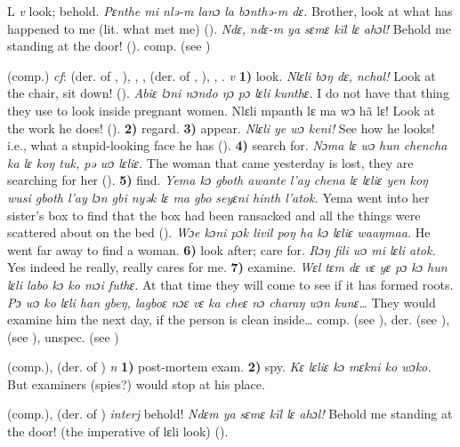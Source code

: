 \begin{letter}{L}
 \textit{v} look; behold. \textit{Pɛnthe mi nlə-m lanɔ la bɔnthə-m dɛ.} Brother, look at what has happened to me (lit. what met me) (\citealt{Pichl1967}). \textit{Ndɛ, ndɛ-m ya sɛmɛ kïl lɛ ahɔl!} Behold me standing at the door! (\citealt{Pichl1967}). comp.  (see )

 (comp.) \textit{cf}:  (der. of , ), , ,  (der. of , ), , . \textit{v} \textbf{1)} look. \textit{Nlɛli bɔŋ dɛ, nchal!} Look at the chair, sit down! (\citealt{Pichl1967}). \textit{Abiɛ lɔni nɔndo ŋɔ pɔ lɛli kunthɛ.} I do not have that thing they use to look inside pregnant women. Nlɛli mpanth lɛ ma wɔ hã lɛ! Look at the work he does! (\citealt{Pichl1967}). \textbf{2)} regard. \textbf{3)} appear. \textit{Nlɛli ye wɔ keni!} See how he looks! i.e., what a stupid-looking face he has (\citealt{Pichl1967}). \textbf{4)} search for. \textit{Nɔma lɛ wɔ hun chencha ka lɛ koŋ tuk, pə wɔ lɛliɛ.} The woman that came yesterday is lost, they are searching for her (\citealt{Pichl1967}). \textbf{5)} find. \textit{Yema kɔ gboth awante l'ay chena lɛ lɛliɛ yen koŋ wusi gboth l'ay lɔn gbi nyək lɛ ma gbo seyɛni hinth l'atok.} Yema went into her sister's box to find that the box had been ransacked and all the things were scattered about on the bed (\citealt{Pichl1967}). \textit{Wɔe kɔni pɔk livil poŋ ha kɔ lɛliɛ waaŋmaa.} He went far away to find a woman. \textbf{6)} look after; care for. \textit{Rɔŋ fili wɔ mi lɛli atok.} Yes indeed he really, really cares for me. \textbf{7)} examine. \textit{Wɛl tɛm dɛ vɛ yɛ pɔ kɔ hun lɛli labo kɔ ko mɔi futhɛ.} At that time they will come to see if it has formed roots. \textit{Pɔ wɔ ko lɛli han gbeŋ, lagboɛ nɔɛ vɛ ka cheɛ nɔ charaŋ wɔn kunɛ…} They would examine him the next day, if the person is clean inside… comp.  (see ), der.  (see ),  (see ), unspec.  (see )

 (comp.), (der. of ) \textit{n} \textbf{1)} post-mortem exam. \textbf{2)} spy. \textit{Kɛ lɛliɛ kɔ mɛkni ko wɔko.} But examiners (spies?) would stop at his place.

 (comp.), (der. of ) \textit{interj} behold! \textit{Ndɛm ya sɛmɛ kïl lɛ ahɔl!} Behold me standing at the door! (the imperative of lɛli look) (\citealt{Pichl1967}). 


\end{letter}
